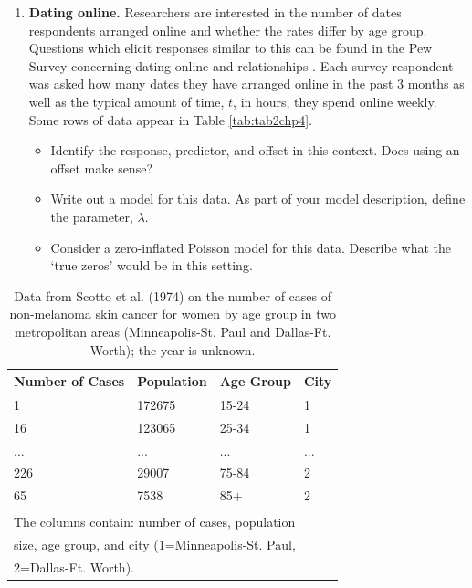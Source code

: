 \documentclass[
]{krantz}
\providecommand{\tightlist}{%
  \setlength{\itemsep}{0pt}\setlength{\parskip}{0pt}}
\begin{document}
\begin{enumerate}
\def\labelenumi{\arabic{enumi}.}
\setcounter{enumi}{14}
\item
  \textbf{Dating online.} Researchers are interested in the number of dates respondents arranged online and whether the rates differ by age group. Questions which elicit responses similar to this can be found in the Pew Survey concerning dating online and relationships \citep{Duggan2013}. Each survey respondent was asked how many dates they have arranged online in the past 3 months as well as the typical amount of time, \(t\), in hours, they spend online weekly. Some rows of data appear in Table \ref{tab:tab2chp4}.

  \begin{itemize}
  \tightlist
  \item
    Identify the response, predictor, and offset in this context. Does using an offset make sense?
  \item
    Write out a model for this data. As part of your model description, define the parameter, \(\lambda\).
  \item
    Consider a zero-inflated Poisson model for this data. Describe what the `true zeros' would be in this setting.
  \end{itemize}
\end{enumerate}

\begin{table}
\centering
\caption{\label{tab:tab3chp4}Data from Scotto et al. (1974) on the number of cases of non-melanoma skin cancer for women by age group in two metropolitan areas (Minneapolis-St. Paul and Dallas-Ft. Worth); the year is unknown.}
\centering
\begin{tabular}[t]{llll}
\toprule
Number of Cases & Population & Age Group & City\\
\midrule
1 & 172675 & 15-24 & 1\\
16 & 123065 & 25-34 & 1\\
... & ... & ... & ...\\
226 & 29007 & 75-84 & 2\\
65 & 7538 & 85+ & 2\\
\bottomrule
\multicolumn{4}{l}{\textsuperscript{} The columns contain: number of cases, population}\\
\multicolumn{4}{l}{size, age group, and city (1=Minneapolis-St. Paul,}\\
\multicolumn{4}{l}{2=Dallas-Ft. Worth).}\\
\end{tabular}
\end{table}
\end{document}
